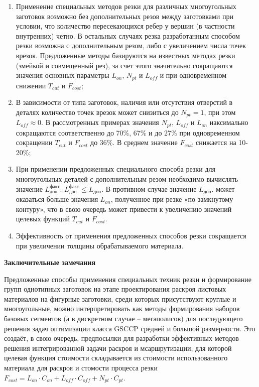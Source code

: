 \documentclass{article}
\begin{document}
\begin{enumerate}
\item Применение специальных методов резки
для различных многоугольных заготовок возможно
без дополнительных резов между заготовками при условии,
что количество пересекающихся ребер у вершин
(в частности внутренних) четно.
В остальных случаях резка разработанным
способом резки возможна с дополнительным резом,
либо с увеличением числа точек врезок.
Предложенные методы базируются на известных методах резки
(змейкой и совмещенный рез),
за счет этого значительно сокращаются
значения основных параметры
$L_{on}$, $N_{pt}$  и $L_{off}$
и   при одновременном снижении
$T_{cut}$
и
$F_{cost}$;

\item В зависимости от типа заготовок,
наличия или отсутствия отверстий в деталях
количество точек врезок может снизиться до
$N_{pt}=1$,
при этом
$L_{off} \approx 0$.
В рассмотренных примерах значения
$N_{pt}$, $L_{off}$ и $L_{on}$
иаксимально сокращаются соответственно до 70\%, 67\% и до 27\%
при одновременном сокращении
$T_{cut}$
и
$F_{cost}$
до 36\%.
В среднем значение $F_{cost}$ снижается на 10-20\%;

\item При применении предложенных специального способа резки
для многоугольных деталей с дополнительным резом
необходимо вычислять значение
$L_\text{доп}^\text{факт}$:
$L_\text{доп}^\text{факт} \leqslant L_\text{доп}$.
В противном случае значение
$L_\text{доп}$.
может оказаться больше значения
$L_{on}$,
полученное при резке «по замкнутому контуру»,
что в свою очередь может привести к увеличению значений целевых функций
$T_{cut}$
и
$F_{cost}$.

\item Эффективность от применения предложенных способов резки
сокращается при увеличении толщины обрабатываемого материала.
\end{enumerate}

{\bf Заключительные замечания}

Предложенные способы применения специальных техник резки и
формирование групп однотипных заготовок на этапе
проектирования раскроя листовых материалов на фигурные заготовки,
среди которых присутствуют круглые и многоугольные,
можно интерпретировать как методы формирования наборов базовых сегментов
(а в дискретном случае – мегаполисов)
для последующего решения задач оптимизации класса GSCCP
средней и большой размерности.
Это создаёт, в свою очередь,
предпосылки  для разработки эффективных методов
решения интегрированной задачи раскроя и мсаршрутизации,
для которой целевая функция стоимости складывается
из стоимости использованного материала для раскроя
и стомости процесса резки
$
F_{cost}=
L_{on} \cdot C_{on} +
L_{off} \cdot C_{off} +
N_{pt} \cdot C_{pt}
$.
\end{document}
